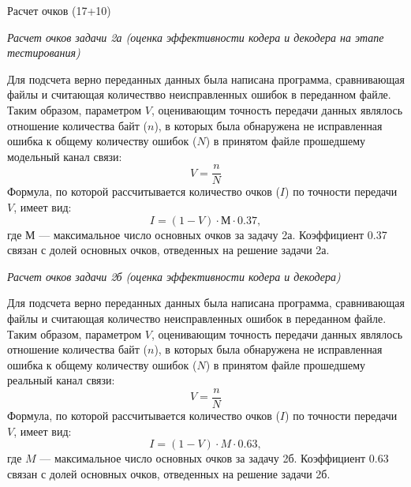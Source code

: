 \markSection

Расчет очков (17+10)

\textit{Расчет очков задачи 2а (оценка эффективности кодера и декодера на этапе тестирования)}

Для подсчета верно переданных данных была написана программа, сравнивающая файлы и считающая количествво неисправленных ошибок в переданном файле. Таким образом, параметром $V$, оценивающим точность передачи данных являлось отношение количества байт ($n$), в которых была обнаружена не исправленная ошибка к общему количеству ошибок ($N$) в принятом файле прошедшему модельный канал связи:
$$V =\frac{n}{N}$$
Формула, по которой рассчитывается количество очков ($I$) по точности передачи $V$, имеет вид:
$$I = (1-V) \cdot М \cdot 0.37,$$
где $М$ — максимальное число основных очков за задачу 2а. Коэффициент 0.37 связан с долей основных очков, отведенных на решение задачи 2а.

\textit{Расчет очков задачи 2б (оценка эффективности кодера и декодера)}

Для подсчета верно переданных данных была написана программа, сравнивающая файлы и считающая количество неисправленных ошибок в переданном файле. Таким образом, параметром $V$, оценивающим точность передачи данных являлось отношение количества байт ($n$), в которых была обнаружена не исправленная ошибка к общему количеству ошибок ($N$) в принятом файле прошедшему реальный канал связи:
$$V = \frac{n}{N}$$
Формула, по которой рассчитывается количество очков ($I$) по точности передачи $V$, имеет вид:
$$I = (1-V) \cdot M \cdot 0.63,$$
где $M$ — максимальное число основных очков за задачу 2б. Коэффициент 0.63 связан с долей основных очков, отведенных на решение задачи 2б.